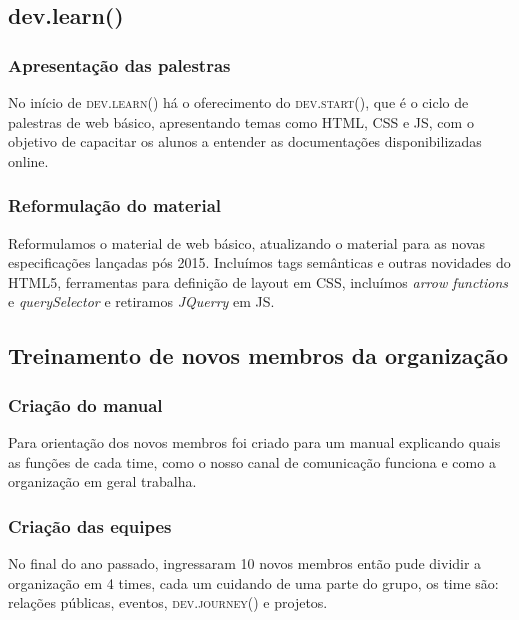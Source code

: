 \documentclass[a0,portrait]{a0poster}
\begin{document}
\begin{multicols}{2}
\subsection*{dev.learn()}
\subsubsection*{Apresentação das palestras}
No início de \textsc{dev.learn()} há o oferecimento do \textsc{dev.start()}, que é o ciclo
de palestras de web básico, apresentando temas como HTML, CSS e JS, com o objetivo de 
capacitar os alunos a entender as documentações disponibilizadas online.

\subsubsection*{Reformulação do material}
Reformulamos o material de web básico, atualizando o material para as novas especificações
lançadas pós 2015. Incluímos tags semânticas e outras novidades do HTML5, ferramentas
para definição de layout em CSS, incluímos \textit{arrow functions} e \textit{querySelector}
e retiramos \textit{JQuerry} em JS.

\subsection*{Treinamento de novos membros da organização}
\subsubsection*{Criação do manual}
Para orientação dos novos membros foi criado para um manual explicando quais as funções de
cada time, como o nosso canal de comunicação funciona e como a organização em geral trabalha.

\subsubsection*{Criação das equipes}
No final do ano passado, ingressaram 10 novos membros então pude dividir a organização em
4 times, cada um cuidando de uma parte do grupo, os time são: relações públicas, eventos,
\textsc{dev.journey()} e projetos.\\[0.5cm]



\end{multicols}
\end{document}
